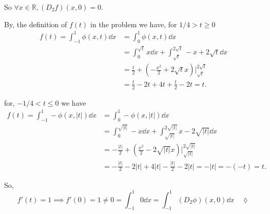 \documentclass{article}
\newcommand\R{\mathbb{R}}
\begin{document}
So $\forall x\in \R, (D_2 f)(x,0) =0$.

By, the definition of $f(t)$ in the problem we have, for $1/4>t\geq 0$
\begin{align*}
  f(t) = \int_{-1}^{1}\phi(x,t) \dd{x}
  &= \int_0^1\phi(x,t)\dd{x}\\
  &= \int_0^{\sqrt{t}} x\dd{x} + \int_{\sqrt{t}}^{2\sqrt{t}}
    -x+2\sqrt{t}\dd{x}\\
  &= \frac{t}{2} +\left(  -\frac{x^2}{2}+2\sqrt{t}x\right) \bigg|_{\sqrt{t}}^{2\sqrt{t}}\\
  &= \frac{t}{2} -2t+4t +\frac{t}{2}-2t  = t.
\end{align*}

for, $-1/4<t \leq 0$ we have
\begin{align*}
  f(t) = \int_{-1}^{1}-\phi(x,|t|) \dd{x}
  &= \int_0^1-\phi(x,|t|)\dd{x}\\
  &= \int_0^{\sqrt{|t|}} -x\dd{x} +\int_{\sqrt{|t|}}^{2\sqrt{|t|}} x-2\sqrt{|t|}\dd{x}\\
  &= -\frac{|t|}{2} +\left(  \frac{x^2}{2}-2\sqrt{|t|}x\right) \bigg|_{\sqrt{|t|}}^{2\sqrt{|t|}}\\
  &= -\frac{|t|}{2} -2|t|+4|t| -\frac{|t|}{2}-2|t|  = -|t| = -(-t) = t.
\end{align*}

So, \[f'(t) = 1 \implies f'(0)= 1 \neq  0  = \int_{-1}^1 0\dd{x} =
  \int_{-1}^1 (D_2 \phi)(x,0) \dd{x}\quad \lozenge\]
\end{document}
